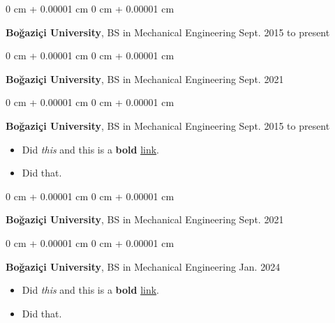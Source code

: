 \documentclass[10pt, letterpaper]{article}
\newenvironment{highlights}{
    \begin{itemize}[
        topsep=0.10 cm,
        parsep=0.10 cm,
        partopsep=0pt,
        itemsep=0pt,
        leftmargin=0 cm + 10pt
    ]
}{
    \end{itemize}
        
    \vspace{-0.20cm}
} %
\newenvironment{onecolentry}{
    \begin{adjustwidth}{
        0 cm + 0.00001 cm
    }{
        0 cm + 0.00001 cm
    }
}{
    \end{adjustwidth}
} %
\begin{document}
        \vspace{0.1 cm}

        \begin{onecolentry}
            \textbf{Boğaziçi University}, BS in Mechanical Engineering \hfill Sept. 2015 to present
        \end{onecolentry}

        \vspace{0.1 cm}

        \begin{onecolentry}
            \textbf{Boğaziçi University}, BS in Mechanical Engineering \hfill Sept. 2021
        \end{onecolentry}

        \vspace{0.1 cm}

        \begin{onecolentry}
            \textbf{Boğaziçi University}, BS in Mechanical Engineering \hfill Sept. 2015 to present
            \begin{highlights}
                \item Did \textit{this} and this is a \textbf{bold} \href{https://example.com}{link}.
                \item Did that.
            \end{highlights}
        \end{onecolentry}

        \vspace{0.1 cm}

        \begin{onecolentry}
            \textbf{Boğaziçi University}, BS in Mechanical Engineering \hfill Sept. 2021
        \end{onecolentry}

        \vspace{0.1 cm}

        \begin{onecolentry}
            \textbf{Boğaziçi University}, BS in Mechanical Engineering \hfill Jan. 2024
            \begin{highlights}
                \item Did \textit{this} and this is a \textbf{bold} \href{https://example.com}{link}.
                \item Did that.
            \end{highlights}
        \end{onecolentry}

        \vspace{0.1 cm}
\end{document}
